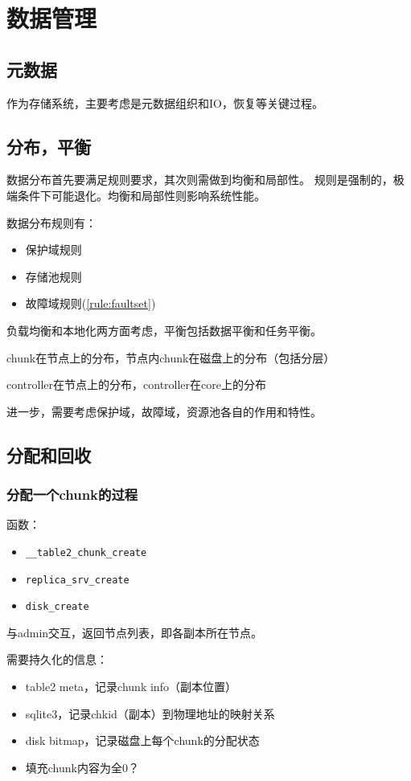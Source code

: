 \chapter{数据管理}

\section{元数据}

作为存储系统，主要考虑是元数据组织和IO，恢复等关键过程。

\section{分布，平衡}

数据分布首先要满足规则要求，其次则需做到均衡和局部性。
规则是强制的，极端条件下可能退化。均衡和局部性则影响系统性能。

数据分布规则有：
\begin{itemize}
\item 保护域规则
\item 存储池规则
\item 故障域规则(\ref{rule:faultset})
\end{itemize}

负载均衡和本地化两方面考虑，平衡包括数据平衡和任务平衡。

chunk在节点上的分布，节点内chunk在磁盘上的分布（包括分层）

controller在节点上的分布，controller在core上的分布

进一步，需要考虑保护域，故障域，资源池各自的作用和特性。

\section{分配和回收}

\subsection{分配一个chunk的过程}

函数：
\begin{itemize}
    \item \verb|__table2_chunk_create|
    \item \verb|replica_srv_create|
    \item \verb|disk_create|
\end{itemize}

与admin交互，返回节点列表，即各副本所在节点。

需要持久化的信息：
\begin{itemize}
    \item table2 meta，记录chunk info（副本位置）
    \item sqlite3，记录chkid（副本）到物理地址的映射关系
    \item disk bitmap，记录磁盘上每个chunk的分配状态
    \item 填充chunk内容为全0？
\end{itemize}

